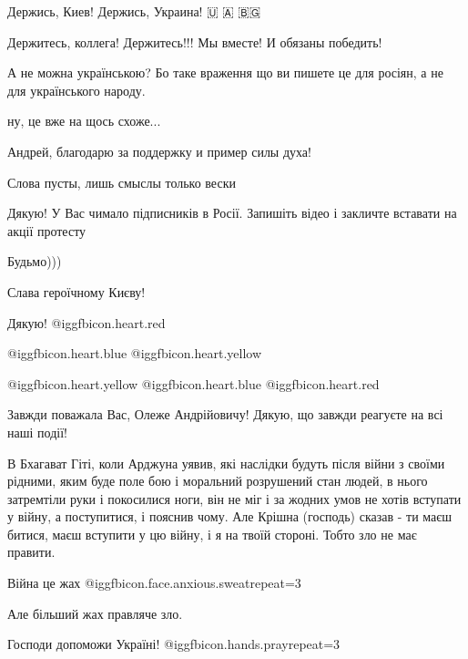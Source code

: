 \begin{itemize}
Держись, Киев! Держись, Украина!  🇺 🇦 🇧🇬

Держитесь, коллега! Держитесь!!! Мы вместе! И обязаны победить!

А не можна українською? Бо таке враження що ви пишете це для росіян, а не для українського народу.

ну, це вже на щось схоже...

Андрей, благодарю за поддержку и пример силы духа!

Слова пусты, лишь смыслы только вески


Дякую! У Вас чимало підписників в Росії. Запишіть відео і закличте вставати на
акції протесту

Будьмо)))

Слава героїчному Києву!

Дякую! @igg{fbicon.heart.red}

 @igg{fbicon.heart.blue}  @igg{fbicon.heart.yellow} 

 @igg{fbicon.heart.yellow}  @igg{fbicon.heart.blue} @igg{fbicon.heart.red}

Завжди поважала Вас, Олеже Андрійовичу! Дякую, що завжди реагуєте на всі наші події!


В Бхагават Гіті, коли Арджуна уявив, які наслідки будуть після війни з своїми
рідними, яким буде поле бою і моральний розрушений стан людей, в нього
затремтіли руки і покосилися ноги, він не міг і за жодних умов не хотів
вступати у війну, а поступитися, і пояснив чому. Але Крішна (господь) сказав -
ти маєш битися, маєш вступити у цю війну, і я на твоїй стороні. Тобто зло не
має правити.

Війна це жах  @igg{fbicon.face.anxious.sweat}{repeat=3} 

Але більший жах правляче зло.

Господи допоможи Україні!  @igg{fbicon.hands.pray}{repeat=3} 

\end{itemize} %
